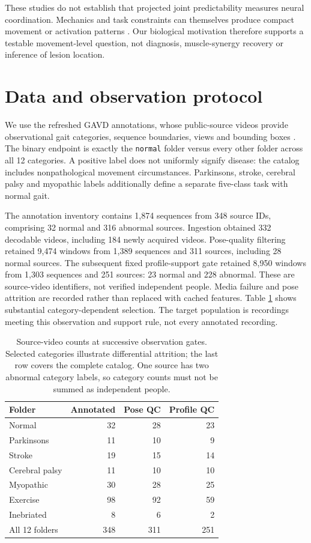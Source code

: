 \documentclass[letterpaper]{article}
\begin{document}
These studies do not establish that projected joint predictability measures neural coordination. Mechanics and task constraints can themselves produce compact movement or activation patterns \citep{kutch2012synergies}. Our biological motivation therefore supports a testable movement-level question, not diagnosis, muscle-synergy recovery or inference of lesion location.

\section{Data and observation protocol}

We use the refreshed GAVD annotations, whose public-source videos provide observational gait categories, sequence boundaries, views and bounding boxes \citep{ranjan2025gavd, gavd2026catalog}. The binary endpoint is exactly the \texttt{normal} folder versus every other folder across all 12 categories. A positive label does not uniformly signify disease: the catalog includes nonpathological movement circumstances. Parkinsons, stroke, cerebral palsy and myopathic labels additionally define a separate five-class task with normal gait.

The annotation inventory contains 1,874 sequences from 348 source IDs, comprising 32 normal and 316 abnormal sources. Ingestion obtained 332 decodable videos, including 184 newly acquired videos. Pose-quality filtering retained 9,474 windows from 1,389 sequences and 311 sources, including 28 normal sources. The subsequent fixed profile-support gate retained 8,950 windows from 1,303 sequences and 251 sources: 23 normal and 228 abnormal. These are source-video identifiers, not verified independent people. Media failure and pose attrition are recorded rather than replaced with cached features. Table \ref{tab:attrition} shows substantial category-dependent selection. The target population is recordings meeting this observation and support rule, not every annotated recording.

\begin{table}[t]
\centering
\begin{tabular}{lrrr}
\toprule
Folder & Annotated & Pose QC & Profile QC \\
\midrule
Normal & 32 & 28 & 23 \\
Parkinsons & 11 & 10 & 9 \\
Stroke & 19 & 15 & 14 \\
Cerebral palsy & 11 & 10 & 10 \\
Myopathic & 30 & 28 & 25 \\
Exercise & 98 & 92 & 59 \\
Inebriated & 8 & 6 & 2 \\
\midrule
All 12 folders & 348 & 311 & 251 \\
\bottomrule
\end{tabular}
\caption{Source-video counts at successive observation gates. Selected categories illustrate differential attrition; the last row covers the complete catalog. One source has two abnormal category labels, so category counts must not be summed as independent people.}
\label{tab:attrition}
\end{table}
\end{document}
